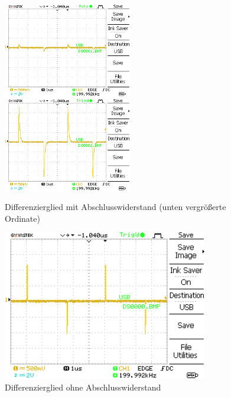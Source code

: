 \documentclass{article}
\begin{document}
			
			\begin{figure}[H]
				\centering
				\includegraphics[width=0.5\textwidth]{MesswerteVersuch1/DS0001.png}
				\includegraphics[width=0.5\textwidth]{MesswerteVersuch1/DS0002.png}
				\caption{Differenzierglied mit Abschlusswiderstand (unten vergrößerte Ordinate)}
				\label{fig:DS0001,2}
			\end{figure}
			\begin{figure}[H]
				\centering
				\includegraphics[width=0.8\textwidth]{MesswerteVersuch1/DS0000.png}
				\caption{Differenzierglied ohne Abschlusswiderstand}
				\label{fig:DS0000}
			\end{figure}
			
\end{document}

